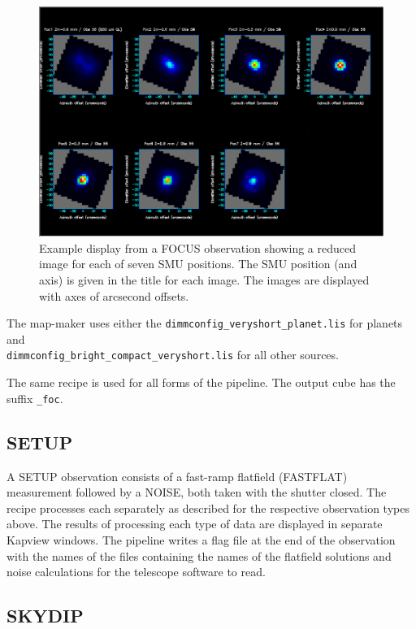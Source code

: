 \documentclass[twoside,11pt]{article}
\renewcommand{\_}{\texttt{\symbol{95}}}
\begin{document}
\begin{figure}[t]
\centering
\includegraphics[width=\textwidth]{sun264_focus.eps}
\caption{Example display from a FOCUS observation showing a reduced
  image for each of seven SMU positions. The SMU position (and axis)
  is given in the title for each image. The images are displayed with
  axes of arcsecond offsets.\label{fig:focus}}
\end{figure}

The map-maker uses either the \verb+dimmconfig_veryshort_planet.lis+
for planets and \\ \verb+dimmconfig_bright_compact_veryshort.lis+ for
all other sources.

The same recipe is used for all forms of the pipeline. The output cube
has the suffix \verb+_foc+.

\subsection{SETUP}

A SETUP observation consists of a fast-ramp flatfield (FASTFLAT)
measurement followed by a NOISE, both taken with the shutter
closed. The recipe processes each separately as described for the
respective observation types above. The results of processing each
type of data are displayed in separate Kapview windows. The pipeline
writes a flag file at the end of the observation with the names of the
files containing the names of the flatfield solutions and noise
calculations for the telescope software to read.

\subsection{SKYDIP}
\end{document}
